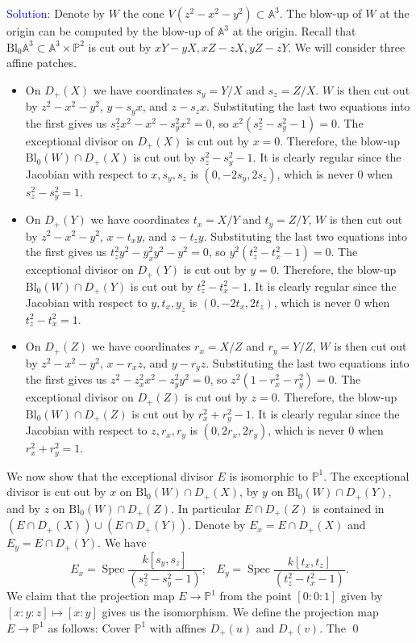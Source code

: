 \documentclass[11pt]{article}
\renewcommand{\AA}{\mathbb{A}}
\newcommand{\PP}{\mathbb{P}}
\DeclareMathOperator{\Spec}{\operatorname{Spec}}
\newcommand{\Bl}{\mathrm{Bl}}
\newenvironment{solution}{\begin{trivlist}\item[]{\textcolor{blue}{Solution:}}}{\qed \end{trivlist}}
\begin{document}
\begin{solution}
    Denote by $W$ the cone $V(z^2 - x^2 - y^2) \subset \AA^3$. The blow-up of $W$ at the origin can be computed by the blow-up of $\AA^3$ at the origin. Recall that $\Bl_0 \AA^3 \subset \AA^3 \times \PP^2$ is cut out by $xY - yX, xZ - zX, yZ - zY$. We will consider three affine patches. 
    \begin{itemize}
        \item On $D_+(X)$ we have coordinates $s_y = Y / X$ and $s_z = Z / X$. $W$ is then cut out by $z^2 - x^2 - y^2$, $y - s_y x$, and $z - s_z x$. Substituting the last two equations into the first gives us $s_z^2x^2 - x^2 - s_y^2 x^2 = 0$, so $x^2 (s_z^2 - s_y^2 - 1) = 0$. The exceptional divisor on $D_+(X)$ is cut out by $x = 0$. Therefore, the blow-up $\Bl_0(W) \cap D_+(X)$ is cut out by $s^2_z - s^2_y - 1$. It is clearly regular since the Jacobian with respect to $x, s_y, s_z$ is $(0, -2s_y, 2s_z)$, which is never 0 when $s_z^2 - s_y^2 = 1$. 
        \item On $D_+(Y)$ we have coordinates $t_x = X / Y$ and $t_y = Z / Y$, $W$ is then cut out by $z^2 - x^2 - y^2$, $x - t_x y$, and $z - t_z y$. Substituting the last two equations into the first gives us $t_z^2 y^2 - y_x^2 y^2 - y^2 = 0$, so $y^2 (t_z^2 - t_x^2 - 1) = 0$. The exceptional divisor on $D_+(Y)$ is cut out by $y = 0$. Therefore, the blow-up $\Bl_0(W) \cap D_+(Y)$ is cut out by $t_z^2 - t_x^2 - 1$. It is clearly regular since the Jacobian with respect to $y, t_x, y_z$ is $(0, -2t_x, 2t_z)$, which is never 0 when $t_z^2 - t_x^2 = 1$. 
        \item On $D_+(Z)$ we have coordinates $r_x = X / Z$ and $r_y = Y / Z$, $W$ is then cut out by $z^2 - x^2 - y^2$, $x - r_x z$, and $y - r_y z$. Substituting the last two equations into the first gives us $z^2 - z_x^2 x^2 - z_y^2 y^2 = 0$, so $z^2 (1 - r_x^2 - r_y^2) = 0$. The exceptional divisor on $D_+(Z)$ is cut out by $z = 0$. Therefore, the blow-up $\Bl_0(W) \cap D_+(Z)$ is cut out by $r_x^2 + r_y^2 - 1$. It is clearly regular since the Jacobian with respect to $z, r_x, r_y$ is $(0, 2r_x, 2r_y)$, which is never 0 when $r_x^2 + r_y^2 = 1$. 
    \end{itemize}

    We now show that the exceptional divisor $E$ is isomorphic to $\PP^1$. The exceptional divisor is cut out by $x$ on $\Bl_0(W) \cap D_+(X)$, by $y$ on $\Bl_0(W) \cap D_+(Y)$, and by $z$ on $\Bl_0(W) \cap D_+(Z)$. In particular $E \cap D_+(Z)$ is contained in $(E \cap D_+(X)) \cup (E \cap D_+(Y))$. Denote by $E_x = E \cap D_+(X)$ and $E_y = E \cap D_+(Y)$. We have 
    \[
        E_x = \Spec \frac{k[s_y, s_z]}{(s_z^2 - s_y^2 - 1)} ; \hspace{10pt}
        E_y = \Spec \frac{k[t_x, t_z]}{(t_z^2 - t_x^2 - 1)}.
    \]
    We claim that the projection map $E \rightarrow \PP^1$ from the point $[0:0:1]$ given by $[x:y:z] \mapsto [x:y]$ gives us the isomorphism. 
    We define the projection map $E \rightarrow \PP^1$ as follows: Cover $\PP^1$ with affines $D_+(u)$ and $D_+(v)$. The 
\end{solution}
\end{document}

